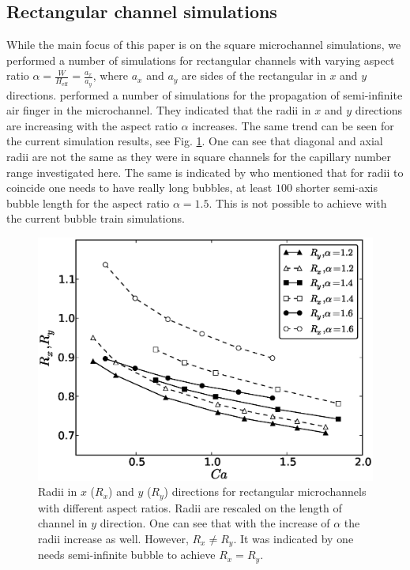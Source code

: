 \documentclass[preprint,12pt]{elsarticle}
\begin{document}
\subsection{Rectangular channel simulations}
While the main focus of this paper is on the square microchannel simulations, we performed a number
of simulations for rectangular channels with varying aspect ratio
$\alpha=\frac{W}{H_{\mathrm{eff}}}=\frac{a_x}{a_y}$, where $a_x$ and $a_y$ are sides of the rectangular in $x$ and $y$ directions.\citet{heil-threedim} performed a number of simulations for the
propagation of semi-infinite air finger in the microchannel. They indicated that the radii in $x$
and $y$ directions  are increasing with the aspect ratio $\alpha$
increases. The same trend can be seen for the current simulation results, see Fig.
\ref{fig:aspect:ratio}. One can see that diagonal and axial radii are not the same as they were in square channels for the capillary number range investigated here. The same is
indicated by \citet{heil-threedim} who mentioned that for radii to coincide one needs to have really long bubbles, at least $100$ shorter semi-axis bubble length for the aspect ratio $\alpha=1.5$. This is not possible to achieve with the
current bubble train simulations.
\begin{figure}[htb!]
\includegraphics[width=\textwidth]{Figures/rectangle.eps}
\caption{Radii in $x$ ($R_x$) and $y$ ($R_y$) directions for rectangular microchannels with
different aspect ratios. Radii are rescaled on the length of channel in $y$ direction. One can see that with
the increase of $\alpha$ the radii increase as well. However, $R_x\neq R_y$. It was indicated by \citet{heil-threedim} one needs semi-infinite bubble to achieve $R_x=R_y$. \label{fig:aspect:ratio}}
\end{figure}
\end{document}
